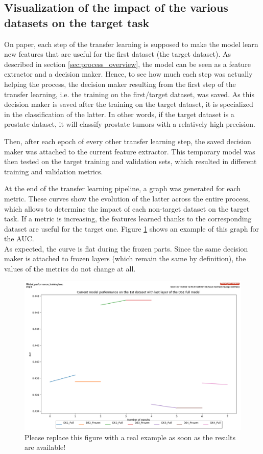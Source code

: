 \subsection{Visualization of the impact of the various datasets on the target task}
\label{sec:global_performance}
On paper, each step of the transfer learning is supposed to make the model learn new features that are useful for the first dataset (the target dataset). As described in section \ref{sec:process_overview}, the model can be seen as a feature extractor and a decision maker. Hence, to see how much each step was actually helping the process, the decision maker resulting from the first step of the transfer learning, i.e. the training on the first/target dataset, was saved. As this decision maker is saved after the training on the target dataset, it is specialized in the classification of the latter. In other words, if the target dataset is a prostate dataset, it will classify prostate tumors with a relatively high precision. 

Then, after each epoch of every other transfer learning step, the saved decision maker was attached to the current feature extractor. This temporary model was then tested on the target training and validation sets, which resulted in different training and validation metrics. 

At the end of the transfer learning pipeline, a graph was generated for each metric. These curves show the evolution of the latter across the entire process, which allows to determine the impact of each non-target dataset on the target task. If a metric is increasing, the features learned thanks to the corresponding dataset are useful for the target one. Figure \ref{fig:global_performance_example} shows an example of this graph for the AUC.\\
As expected, the curve is flat during the frozen parts. Since the same decision maker is attached to frozen layers (which remain the same by definition), the values of the metrics do not change at all. 

\begin{figure}[!h]
\centering
\includegraphics[width=1\textwidth, keepaspectratio=true]{./figures/global_performance_example.png}
\caption{Please replace this figure with a real example as soon as the results are available!}
\label{fig:global_performance_example}
\end{figure}


